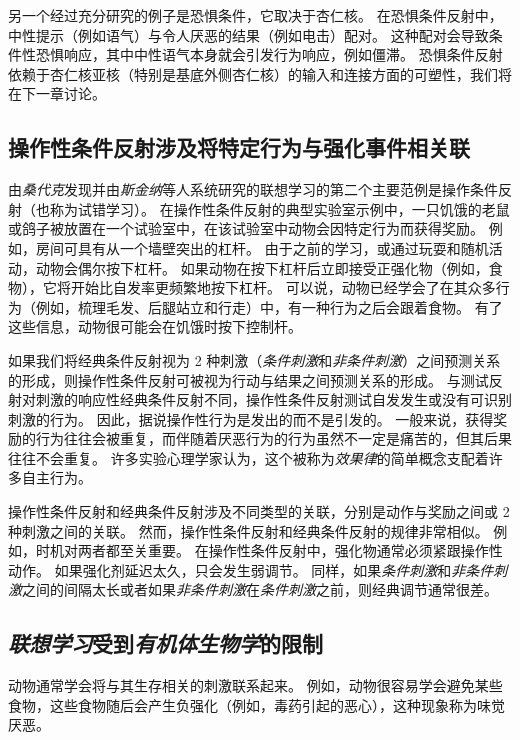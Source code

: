 另一个经过充分研究的例子是恐惧条件，它取决于杏仁核。
在恐惧条件反射中，中性提示（例如语气）与令人厌恶的结果（例如电击）配对。
这种配对会导致条件性恐惧响应，其中中性语气本身就会引发行为响应，例如僵滞。
恐惧条件反射依赖于杏仁核亚核（特别是基底外侧杏仁核）的输入和连接方面的可塑性，我们将在下一章讨论。



\subsection{操作性条件反射涉及将特定行为与强化事件相关联}

由\textit{桑代克}发现并由\textit{斯金纳}等人系统研究的联想学习的第二个主要范例是操作条件反射（也称为试错学习）。
在操作性条件反射的典型实验室示例中，一只饥饿的老鼠或鸽子被放置在一个试验室中，在该试验室中动物会因特定行为而获得奖励。
例如，房间可具有从一个墙壁突出的杠杆。
由于之前的学习，或通过玩耍和随机活动，动物会偶尔按下杠杆。
如果动物在按下杠杆后立即接受正强化物（例如，食物），它将开始比自发率更频繁地按下杠杆。
可以说，动物已经学会了在其众多行为（例如，梳理毛发、后腿站立和行走）中，有一种行为之后会跟着食物。
有了这些信息，动物很可能会在饥饿时按下控制杆。


如果我们将经典条件反射视为 2 种刺激（\textit{条件刺激}和\textit{非条件刺激}）之间预测关系的形成，则操作性条件反射可被视为行动与结果之间预测关系的形成。
与测试反射对刺激的响应性经典条件反射不同，操作性条件反射测试自发发生或没有可识别刺激的行为。
因此，据说操作性行为是发出的而不是引发的。
一般来说，获得奖励的行为往往会被重复，而伴随着厌恶行为的行为虽然不一定是痛苦的，但其后果往往不会重复。
许多实验心理学家认为，这个被称为\textit{效果律}的简单概念支配着许多自主行为。


操作性条件反射和经典条件反射涉及不同类型的关联，分别是动作与奖励之间或 2 种刺激之间的关联。
然而，操作性条件反射和经典条件反射的规律非常相似。
例如，时机对两者都至关重要。
在操作性条件反射中，强化物通常必须紧跟操作性动作。
如果强化剂延迟太久，只会发生弱调节。
同样，如果\textit{条件刺激}和\textit{非条件刺激}之间的间隔太长或者如果\textit{非条件刺激}在\textit{条件刺激}之前，则经典调节通常很差。



\subsection{\textit{联想学习}受到\textit{有机体生物学}的限制}

动物通常学会将与其生存相关的刺激联系起来。
例如，动物很容易学会避免某些食物，这些食物随后会产生负强化（例如，毒药引起的恶心），这种现象称为味觉厌恶。



